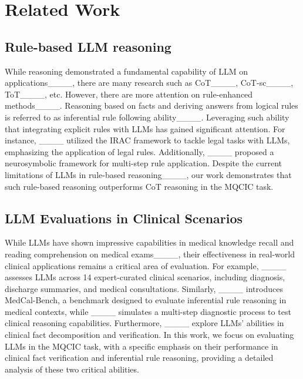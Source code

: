 \section{Related Work}
\subsection{Rule-based LLM reasoning}
While reasoning demonstrated a fundamental capability of LLM on applications____, there are many research such as CoT____, CoT-sc____, ToT____, etc. However, there are more attention on rule-enhanced methods____. Reasoning based on facts and deriving answers from logical rules is referred to as inferential rule following ability____. Leveraging such ability that integrating explicit rules with LLMs has gained significant attention. For instance, ____ utilized the IRAC framework to tackle legal tasks with LLMs, emphasizing the application of legal rules. Additionally, ____ proposed a neurosymbolic framework for multi-step rule application. Despite the current limitations of LLMs in rule-based reasoning____, our work demonstrates that such rule-based reasoning outperforms CoT reasoning in the MQCIC task.

\subsection{LLM Evaluations in Clinical Scenarios}
While LLMs have shown impressive capabilities in medical knowledge recall and reading comprehension on medical exams____, their effectiveness in real-world clinical applications remains a critical area of evaluation. For example, ____ assesses LLMs across 14 expert-curated clinical scenarios, including diagnosis, discharge summaries, and medical consultations. Similarly, ____ introduces MedCal-Bench, a benchmark designed to evaluate inferential rule reasoning in medical contexts, while ____ simulates a multi-step diagnostic process to test clinical reasoning capabilities. Furthermore, ____ explore LLMs' abilities in clinical fact decomposition and verification. In this work, we focus on evaluating LLMs in the MQCIC task, with a specific emphasis on their performance in clinical fact verification and inferential rule reasoning, providing a detailed analysis of these two critical abilities.
